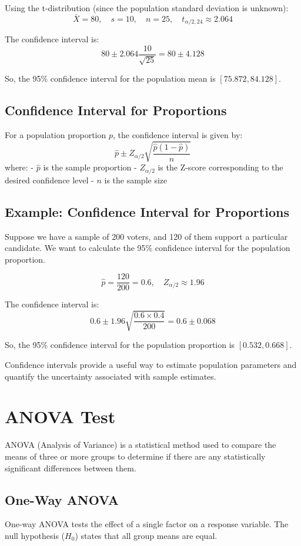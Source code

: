 \documentclass{article}
\begin{document}
Using the t-distribution (since the population standard deviation is unknown):
\[
\bar{X} = 80, \quad s = 10, \quad n = 25, \quad t_{\alpha/2, 24} \approx 2.064
\]

The confidence interval is:
\[
80 \pm 2.064 \frac{10}{\sqrt{25}} = 80 \pm 4.128
\]

So, the 95\% confidence interval for the population mean is \([75.872, 84.128]\).

\subsection{Confidence Interval for Proportions}
For a population proportion \(p\), the confidence interval is given by:
\[
\hat{p} \pm Z_{\alpha/2} \sqrt{\frac{\hat{p}(1 - \hat{p})}{n}}
\]
where:
- \(\hat{p}\) is the sample proportion
- \(Z_{\alpha/2}\) is the Z-score corresponding to the desired confidence level
- \(n\) is the sample size

\subsection{Example: Confidence Interval for Proportions}
Suppose we have a sample of 200 voters, and 120 of them support a particular candidate. We want to calculate the 95\% confidence interval for the population proportion.

\[
\hat{p} = \frac{120}{200} = 0.6, \quad Z_{\alpha/2} \approx 1.96
\]

The confidence interval is:
\[
0.6 \pm 1.96 \sqrt{\frac{0.6 \times 0.4}{200}} = 0.6 \pm 0.068
\]

So, the 95\% confidence interval for the population proportion is \([0.532, 0.668]\).

Confidence intervals provide a useful way to estimate population parameters and quantify the uncertainty associated with sample estimates.

\section{ANOVA Test}
ANOVA (Analysis of Variance) is a statistical method used to compare the means of three or more groups to determine if there are any statistically significant differences between them.

\subsection{One-Way ANOVA}
One-way ANOVA tests the effect of a single factor on a response variable. The null hypothesis (\(H_0\)) states that all group means are equal.
\end{document}
